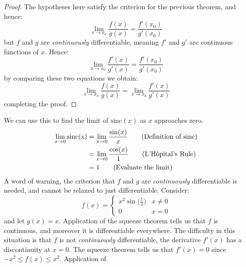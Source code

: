 \documentclass{article}
\theoremstyle{plain}
\begin{document}
    \begin{proof}
        The hypotheses here satisfy the criterion for the previous theorem, and
        hence:
        \begin{equation}
            \lim_{x\rightarrow{x}_{0}}\frac{f(x)}{g(x)}
                =\frac{f'(x_{0})}{g'(x_{0})}
        \end{equation}
        but $f$ and $g$ are \textit{continuously} differentiable, meaning
        $f'$ and $g'$ are continuous functions of $x$. Hence:
        \begin{equation}
            \lim_{x\rightarrow{x}_{0}}\frac{f'(x)}{g'(x)}
                =\frac{f'(x_{0})}{g'(x_{0})}
        \end{equation}
        by comparing these two equations we obtain:
        \begin{equation}
            \lim_{x\rightarrow{x}_{0}}\frac{f(x)}{g(x)}
                =\lim_{x\rightarrow{x}_{0}}\frac{f'(x)}{g'(x)}
        \end{equation}
        completing the proof.
    \end{proof}
    We can use this to find the limit of $\textrm{sinc}(x)$ as $x$ approaches
    zero.
    \begin{align}
        \lim_{x\rightarrow{0}}\textrm{sinc(x)}
            &=\lim_{x\rightarrow{0}}\frac{\sin(x)}{x}
                \tag{Definition of $\textrm{sinc}$}\\
            &=\lim_{x\rightarrow{0}}
                \frac{\cos(x)}{1}
                    \tag{L'H\^{o}pital's Rule}\\
            &=1
                \tag{Evaluate the limit}
    \end{align}
    A word of warning, the criterion that $f$ and $g$ are \textit{continuously}
    differentiable is needed, and cannot be relaxed to just differentiable.
    Consider:
    \begin{equation}
        f(x)=
        \begin{cases}
            x^{2}\sin\big(\frac{1}{x}\big)&x\ne{0}\\
            0&x=0
        \end{cases}
    \end{equation}
    and let $g(x)=x$. Application of the squeeze theorem tells us that $f$ is
    continuous, and moreover it is differentiable everywhere. The difficulty
    in this situation is that $f$ is not \textit{continuously} differentiable,
    the derivative $f'(x)$ has a discontinuity at $x=0$. The squeeze theorem
    tells us that $f'(x)=0$ since $-x^{2}\leq{f}(x)\leq{x}^{2}$. Application of
\end{document}
